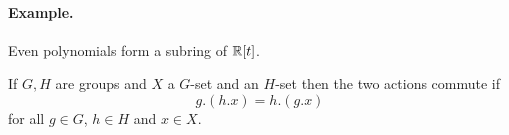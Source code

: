 \documentclass[12pt,a4paper]{scrartcl}
\begin{document}
\begin{otherlanguage}{english}
\paragraph{Example.} Even polynomials form a subring of $\mathbb R[t]$.

\begin{defi}
  If $G,H$ are groups and $X$ a $G$-set and an $H$-set then the two actions commute if \[g.(h.x) = h.(g.x)\] for all $g\in G$, $h\in H$ and $x \in X$.
\end{defi}

\end{otherlanguage}
\end{document}
